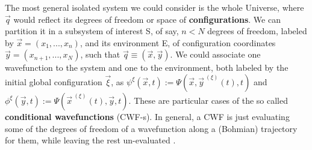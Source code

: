 \documentclass[11pt, a4paper]{article} %
\begin{document}
The most general isolated system we could consider is the whole Universe, where $\vec{q}$ would reflect its degrees of freedom or space of {\bf configurations}. We can partition it in a subsystem of interest S, of say, $n<N$ degrees of freedom, labeled by $\vec{x}=(x_1,...,x_n)$, and its environment E, of configuration coordinates $\vec{y}=(x_{n+1},...,x_N)$, such that $\vec{q}\equiv (\vec{x},\vec{y})$. We could associate one wavefunction to the system and one to the environment, both labeled by the initial global configuration $\vec{\xi}$, as $\psi^\xi(\vec{x},t):=\Psi(\vec{x},\vec{y}^{\:(\xi)}(t),t)$ and $\phi^\xi(\vec{y},t):=\Psi(\vec{x}^{\:(\xi)}(t),\vec{y},t)$. These are particular cases of the so called {\bf conditional wavefunctions} (CWF-s). In general, a CWF is just evaluating some of the degrees of freedom of a wavefunction along a (Bohmian) trajectory for them, while leaving the rest un-evaluated \cite{Absolute, JordiXavier}.
\end{document}
